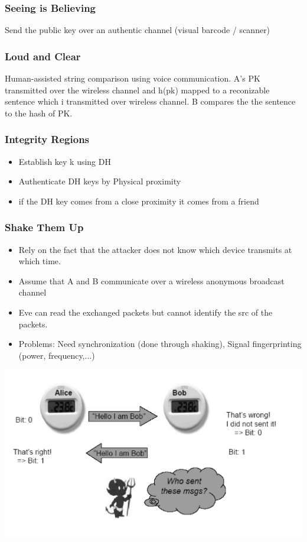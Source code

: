 \subsubsection{Seeing is Believing}
Send the public key over an authentic channel (visual barcode / scanner)

\subsubsection{Loud and Clear}
Human-assisted string comparison using voice communication. A's PK transmitted over the wireless channel and h(pk) mapped to a reconizable sentence which i transmitted over wireless channel. B compares the the sentence to the hash of PK.

\subsubsection{Integrity Regions}
\begin{itemize}
    \item Establish key k using DH
    \item Authenticate DH keys by Physical proximity
    \item if the DH key comes from a close proximity it comes from a friend
\end{itemize}

\subsubsection{Shake Them Up}
\begin{itemize}
    \item Rely on the fact that the attacker does not know which device transmits at which time.
    \item Assume that A and B communicate over a wireless anonymous broadcast channel
    \item Eve can read the exchanged packets but cannot identify the src of the packets.
    \item Problems: Need synchronization (done through shaking), Signal fingerprinting (power, frequency,...)
\end{itemize}

\begin{minipage}{\linewidth}
    \centering      
    \includegraphics[width=\linewidth]{Figures/L8_shake_up.PNG}
\end{minipage}
